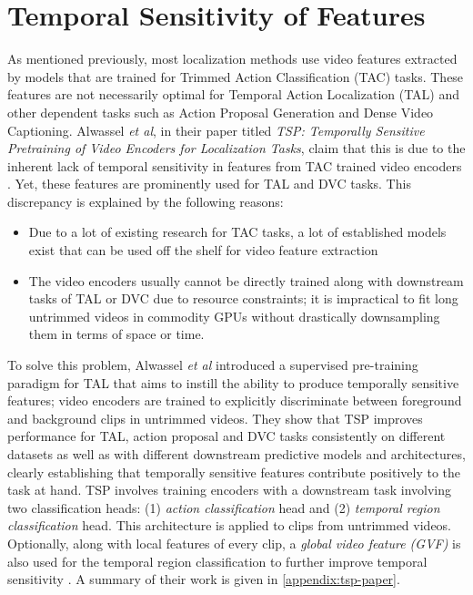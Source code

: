 \section{Temporal Sensitivity of Features}
\par As mentioned previously, most localization methods use video features extracted by models that are trained for Trimmed Action Classification (TAC) tasks. These features are not necessarily optimal for Temporal Action Localization (TAL) and other dependent tasks such as Action Proposal Generation and Dense Video Captioning. Alwassel \textit{et al}, in their paper titled \textit{TSP: Temporally Sensitive Pretraining of Video Encoders for Localization Tasks}, claim that this is due to the inherent lack of temporal sensitivity in features from TAC trained video encoders \cite{alwassel2021tsp}. Yet, these features are prominently used for TAL and DVC tasks. This discrepancy is explained by the following reasons:
\begin{itemize}
	\item Due to a lot of existing research for TAC tasks, a lot of established models exist that can be used off the shelf for video feature extraction
	\item The video encoders usually cannot be directly trained along with downstream tasks of TAL or DVC due to resource constraints; it is impractical to fit long untrimmed videos in commodity GPUs without drastically downsampling them in terms of space or time.
\end{itemize}

\par To solve this problem, Alwassel \textit{et al} introduced a supervised pre-training paradigm for TAL that aims to instill the ability to produce temporally sensitive features; video encoders are trained to explicitly discriminate between foreground and background clips in untrimmed videos. They show that TSP improves performance for TAL, action proposal and DVC tasks consistently on different datasets as well as with different downstream predictive models and architectures, clearly establishing that temporally sensitive features contribute positively to the task at hand. TSP involves training encoders with a downstream task involving two classification heads: (1) \textit{action classification} head and (2) \textit{temporal region classification} head. This architecture is applied to clips from untrimmed videos. Optionally, along with local features of every clip, a \textit{global video feature (GVF)} is also used for the temporal region classification to further improve temporal sensitivity \cite{alwassel2021tsp}. A summary of their work is given in \ref{appendix:tsp-paper}.


